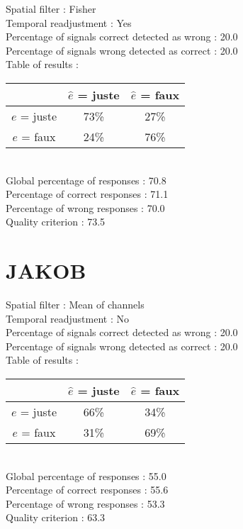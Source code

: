 Spatial filter : Fisher \\
Temporal readjustment : Yes \\
Percentage of signals correct detected as wrong :   20.0 \\
Percentage of signals wrong detected as correct :   20.0 \\
Table of results : \\
\begin{tabular}{|c|c|c|}
\hline				& $\hat{e}$ = juste & $\hat{e}$ = faux \\
\hline  $e$ = juste	&     73\%			&     27\%		\\
\hline  $e$ = faux	&     24\%			&     76\%		\\
\hline
\end{tabular}\\
Global percentage of responses :   70.8 \\
Percentage of correct responses :   71.1 \\
Percentage of wrong responses :   70.0 \\
Quality criterion :   73.5 \\

\section*{JAKOB}
Spatial filter : Mean of channels \\
Temporal readjustment : No \\
Percentage of signals correct detected as wrong :   20.0 \\
Percentage of signals wrong detected as correct :   20.0 \\
Table of results : \\
\begin{tabular}{|c|c|c|}
\hline				& $\hat{e}$ = juste & $\hat{e}$ = faux \\
\hline  $e$ = juste	&     66\%			&     34\%		\\
\hline  $e$ = faux	&     31\%			&     69\%		\\
\hline
\end{tabular}\\
Global percentage of responses :   55.0 \\
Percentage of correct responses :   55.6 \\
Percentage of wrong responses :   53.3 \\
Quality criterion :   63.3 \\

